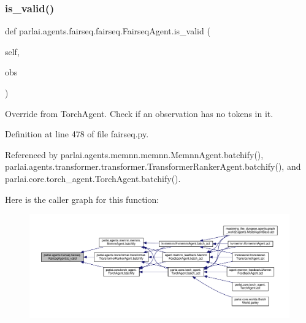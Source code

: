 \subsubsection{\texorpdfstring{is\+\_\+valid()}{is\_valid()}}
{\footnotesize\ttfamily def parlai.\+agents.\+fairseq.\+fairseq.\+Fairseq\+Agent.\+is\+\_\+valid (\begin{DoxyParamCaption}\item[{}]{self,  }\item[{}]{obs }\end{DoxyParamCaption})}

\begin{DoxyVerb}Override from TorchAgent.
Check if an observation has no tokens in it.\end{DoxyVerb}
 

Definition at line 478 of file fairseq.\+py.



Referenced by parlai.\+agents.\+memnn.\+memnn.\+Memnn\+Agent.\+batchify(), parlai.\+agents.\+transformer.\+transformer.\+Transformer\+Ranker\+Agent.\+batchify(), and parlai.\+core.\+torch\+\_\+agent.\+Torch\+Agent.\+batchify().

Here is the caller graph for this function\+:
\nopagebreak
\begin{figure}[H]
\begin{center}
\leavevmode
\includegraphics[width=350pt]{classparlai_1_1agents_1_1fairseq_1_1fairseq_1_1FairseqAgent_a42b30bed79467abe02d8b7c65ff33b9c_icgraph}
\end{center}
\end{figure}
\mbox{\label{classparlai_1_1agents_1_1fairseq_1_1fairseq_1_1FairseqAgent_a20245b04f2a8229809368fb7c43f81e3}} 
